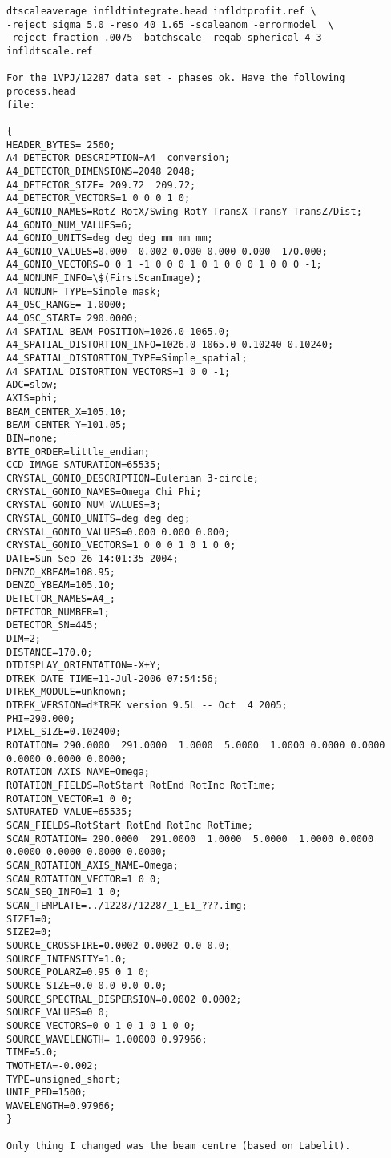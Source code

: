 \documentclass[a4paper, 11pt]{article}
\begin{document}
{\begin{verbatim}
dtscaleaverage infldtintegrate.head infldtprofit.ref \
-reject sigma 5.0 -reso 40 1.65 -scaleanom -errormodel  \
-reject fraction .0075 -batchscale -reqab spherical 4 3 infldtscale.ref 

For the 1VPJ/12287 data set - phases ok. Have the following process.head
file:

{
HEADER_BYTES= 2560;
A4_DETECTOR_DESCRIPTION=A4_ conversion;
A4_DETECTOR_DIMENSIONS=2048 2048;
A4_DETECTOR_SIZE= 209.72  209.72;
A4_DETECTOR_VECTORS=1 0 0 0 1 0;
A4_GONIO_NAMES=RotZ RotX/Swing RotY TransX TransY TransZ/Dist;
A4_GONIO_NUM_VALUES=6;
A4_GONIO_UNITS=deg deg deg mm mm mm;
A4_GONIO_VALUES=0.000 -0.002 0.000 0.000 0.000  170.000;
A4_GONIO_VECTORS=0 0 1 -1 0 0 0 1 0 1 0 0 0 1 0 0 0 -1;
A4_NONUNF_INFO=\$(FirstScanImage);
A4_NONUNF_TYPE=Simple_mask;
A4_OSC_RANGE= 1.0000;
A4_OSC_START= 290.0000;
A4_SPATIAL_BEAM_POSITION=1026.0 1065.0; 
A4_SPATIAL_DISTORTION_INFO=1026.0 1065.0 0.10240 0.10240;
A4_SPATIAL_DISTORTION_TYPE=Simple_spatial;
A4_SPATIAL_DISTORTION_VECTORS=1 0 0 -1;
ADC=slow;
AXIS=phi;
BEAM_CENTER_X=105.10;
BEAM_CENTER_Y=101.05;
BIN=none;
BYTE_ORDER=little_endian;
CCD_IMAGE_SATURATION=65535;
CRYSTAL_GONIO_DESCRIPTION=Eulerian 3-circle;
CRYSTAL_GONIO_NAMES=Omega Chi Phi;
CRYSTAL_GONIO_NUM_VALUES=3;
CRYSTAL_GONIO_UNITS=deg deg deg;
CRYSTAL_GONIO_VALUES=0.000 0.000 0.000;
CRYSTAL_GONIO_VECTORS=1 0 0 0 1 0 1 0 0;
DATE=Sun Sep 26 14:01:35 2004;
DENZO_XBEAM=108.95;
DENZO_YBEAM=105.10;
DETECTOR_NAMES=A4_;
DETECTOR_NUMBER=1;
DETECTOR_SN=445;
DIM=2;
DISTANCE=170.0;
DTDISPLAY_ORIENTATION=-X+Y;
DTREK_DATE_TIME=11-Jul-2006 07:54:56;
DTREK_MODULE=unknown;
DTREK_VERSION=d*TREK version 9.5L -- Oct  4 2005;
PHI=290.000;
PIXEL_SIZE=0.102400;
ROTATION= 290.0000  291.0000  1.0000  5.0000  1.0000 0.0000 0.0000 0.0000 0.0000 0.0000;
ROTATION_AXIS_NAME=Omega;
ROTATION_FIELDS=RotStart RotEnd RotInc RotTime;
ROTATION_VECTOR=1 0 0;
SATURATED_VALUE=65535;
SCAN_FIELDS=RotStart RotEnd RotInc RotTime;
SCAN_ROTATION= 290.0000  291.0000  1.0000  5.0000  1.0000 0.0000 0.0000 0.0000 0.0000 0.0000;
SCAN_ROTATION_AXIS_NAME=Omega;
SCAN_ROTATION_VECTOR=1 0 0;
SCAN_SEQ_INFO=1 1 0;
SCAN_TEMPLATE=../12287/12287_1_E1_???.img;
SIZE1=0;
SIZE2=0;
SOURCE_CROSSFIRE=0.0002 0.0002 0.0 0.0;
SOURCE_INTENSITY=1.0;
SOURCE_POLARZ=0.95 0 1 0;
SOURCE_SIZE=0.0 0.0 0.0 0.0;
SOURCE_SPECTRAL_DISPERSION=0.0002 0.0002;
SOURCE_VALUES=0 0;
SOURCE_VECTORS=0 0 1 0 1 0 1 0 0;
SOURCE_WAVELENGTH= 1.00000 0.97966;
TIME=5.0;
TWOTHETA=-0.002;
TYPE=unsigned_short;
UNIF_PED=1500;
WAVELENGTH=0.97966;
}

Only thing I changed was the beam centre (based on Labelit).

\end{verbatim}
}
\end{document}
